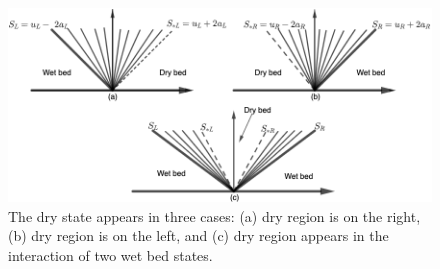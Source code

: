 \documentclass[12pt,a4paper]{article}
\begin{document}
	
	
	  
	  \begin{figure}[H]
	  	\centering
	  	\includegraphics[width=0.7\linewidth]{images/dry-wet}
	  	\caption{The dry state appears in three cases: (a) dry region is on the right, (b) dry region is on the left, and (c) dry region appears in the interaction of two wet bed states.}
	  	\label{fig:dry-wet}
	  \end{figure}
	  
\end{document}
